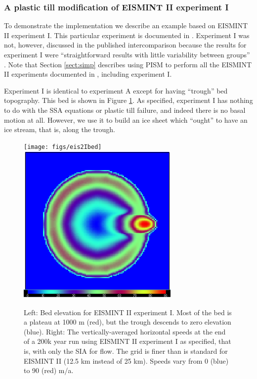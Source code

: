 \documentclass[11pt,final]{amsart}
\begin{document}
\subsubsection*{A plastic till modification of EISMINT II experiment I}  To demonstrate the implementation we describe an example based on EISMINT II experiment I.  This particular experiment is documented in \cite{EISIIdescribe}.  Experiment I was not, however, discussed in the published intercomparison because the results for experiment I were ``straightforward results with little variability between groups'' \cite{EISMINT00}.  Note that Section \ref{sect:simp} describes using PISM to perform all the EISMINT II experiments documented in \cite{EISIIdescribe}, including experiment I.

Experiment I is identical to experiment A except for having ``trough'' bed topography.  This bed is shown in Figure \ref{fig:eis2I}.  As specified, experiment I has nothing to do with the SSA equations or plastic till failure, and indeed there is no basal motion at all.  However, we use it to build an ice sheet which ``ought'' to have an ice stream, that is, along the trough.

\begin{figure}[ht]
\texttt{[image: figs/eis2Ibed]} \includegraphics[height=3.1in,keepaspectratio=true]{figs/cbar_eis2I}
\caption{Left: Bed elevation for EISMINT II experiment I.  Most of the bed is a plateau at 1000 m (red), but the trough descends to zero elevation (blue).  Right: The vertically-averaged horizontal speeds at the end of a 200k year run using EISMINT II experiment I as specified, that is, with only the SIA for flow.  The grid is finer than is standard for EISMINT II (12.5 km instead of 25 km).  Speeds vary from 0 (blue) to 90 (red) m/a.}
\label{fig:eis2I}
\end{figure}
\end{document}
